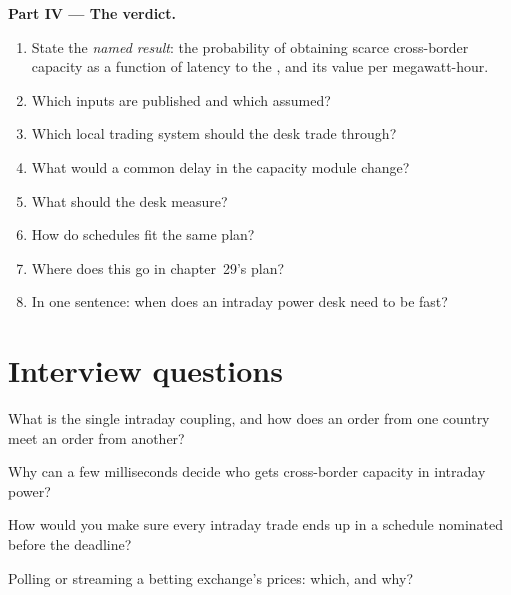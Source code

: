 \begin{problem}
\medskip\noindent\textbf{Part IV --- The verdict.}
\begin{enumerate}[resume]
\item State the \emph{named result}: the probability of obtaining scarce cross-border capacity as a function of latency to the , and its value per megawatt-hour.
\item Which inputs are published and which assumed?
\item Which local trading system should the desk trade through?
\item What would a common delay in the capacity module change?
\item What should the desk measure?
\item How do schedules fit the same plan?
\item Where does this go in chapter~29's plan?
\item In one sentence: when does an intraday power desk need to be fast?
\end{enumerate}
\end{problem}

\section{Interview questions}

\begin{interviewq}\label{iq:nw:power-commodities-and-betting-connectivity:1}
What is the single intraday coupling, and how does an order from one country meet an order from another?
\end{interviewq}

\begin{interviewq}\label{iq:nw:power-commodities-and-betting-connectivity:2}
Why can a few milliseconds decide who gets cross-border capacity in intraday power?
\end{interviewq}

\begin{interviewq}\label{iq:nw:power-commodities-and-betting-connectivity:3}
How would you make sure every intraday trade ends up in a schedule nominated before the deadline?
\end{interviewq}

\begin{interviewq}\label{iq:nw:power-commodities-and-betting-connectivity:4}
Polling or streaming a betting exchange's prices: which, and why?
\end{interviewq}

